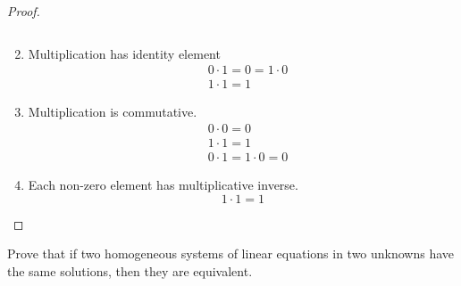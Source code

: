 \begin{proof}
\begin{enumerate}[label = (\arabic*)]
\[		      \]
		\item Multiplication has identity element
		      \[
			      \begin{split}
				      &0\cdot 1 = 0 = 1\cdot 0 \\
				      &1\cdot 1 = 1
			      \end{split}
		      \]
		\item Multiplication is commutative.
		      \[
			      \begin{split}
				      &0\cdot 0 = 0 \\
				      &1\cdot 1 = 1 \\
				      &0\cdot 1 = 1\cdot 0 = 0
			      \end{split}
		      \]
		\item Each non-zero element has multiplicative inverse.
		      \[
			      1\cdot 1 = 1
		      \]
	\end{enumerate}
\end{proof}

\begin{exercise}
	Prove that if two homogeneous systems of linear equations in two unknowns have the same solutions, then they are equivalent.
\end{exercise}

